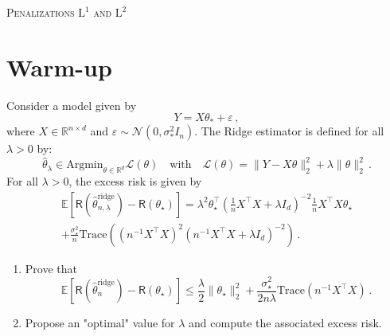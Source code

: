 \documentclass[a4paper,10pt,fleqn]{article}
\newcommand{\eqsp}{\,}
\newcommand{\1}{\ensuremath{\mathbbm{1}}}
\newcommand{\bE}{\mathbb{E}}
\newcommand{\param}{\theta}
\begin{document}
\noindent\hrulefill

\begin{center}
\textsc{Penalizations $\mathrm{L}^1$ and $\mathrm{L}^2$}
\end{center}
\hrulefill

\medskip

\section{Warm-up}
Consider a model given by 
$$
Y = X\theta_* + \varepsilon\,,
$$
where $X\in\mathbb{R}^{n\times d}$ and $\varepsilon \sim \mathcal{N}(0,\sigma_*^2I_n)$. The Ridge estimator  is defined for all $\lambda>0$ by:
$$
\widehat{\theta}_{\lambda}\in\mathrm{Argmin}_{\theta\in\mathbb{R}^d} \mathcal{L}(\theta)\quad\mathrm{with} \quad \mathcal{L}(\theta) = \|Y-X\theta\|_2^2 + \lambda \|\theta\|_2^2\,.
 $$
For all $\lambda>0$, the excess risk is given by
\begin{multline*}
\bE\left[\mathsf{R}(\widehat \param^{\mathrm{ridge}}_{n,\lambda}) - \mathsf{R}(\param_\star)\right] = \lambda^2\param_\star^\top\left(\frac{1}{n}X^\top X + \lambda I_d\right)^{-2} \frac{1}{n}X^\top X \param_\star \\
+\frac{\sigma_\star^{2}}{n}\mathrm{Trace}\left((n^{-1}X^\top X)^2(n^{-1}X^\top X + \lambda I_d)^{-2}\right)\eqsp.
\end{multline*}

\begin{enumerate}
\item Prove that 
$$
\bE\left[\mathsf{R}(\widehat \param^{\mathrm{ridge}}_n) - \mathsf{R}(\param_\star)\right]  \leqslant \frac{\lambda}{2}\|\param_\star\|_2^2 + \frac{\sigma_\star^{2}}{2n\lambda}\mathrm{Trace}\left(n^{-1}X^\top X\right)\eqsp.
$$

\vspace{.2cm}

{\em

}

\item Propose an "optimal" value for $\lambda$ and  compute the associated excess risk.

\vspace{.2cm}

{\em

}
\end{enumerate}
\end{document}
